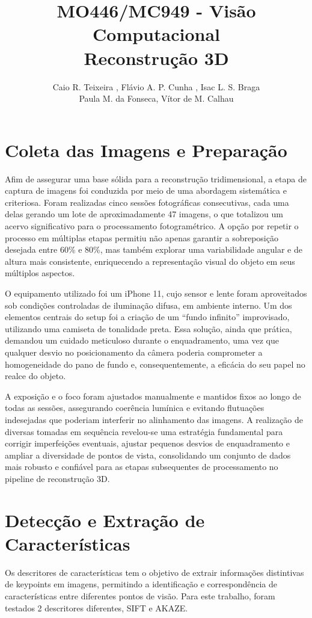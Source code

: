 \documentclass[12pt]{article}
\title{MO446/MC949 - Visão Computacional\\Reconstrução 3D}
\author{Caio R. Teixeira , Flávio A. P. Cunha , Isac L. S. Braga \\ Paula M. da Fonseca, Vítor de M. Calhau}
\begin{document}
 

\maketitle


\section{Coleta das Imagens e Preparação}
Afim de assegurar uma base sólida para a reconstrução tridimensional, a etapa de captura de imagens foi conduzida por meio de uma abordagem sistemática e criteriosa. Foram realizadas cinco sessões fotográficas consecutivas, cada uma delas gerando um lote de aproximadamente 47 imagens, o que totalizou um acervo significativo para o processamento fotogramétrico. A opção por repetir o processo em múltiplas etapas permitiu não apenas garantir a sobreposição desejada entre 60\% e 80\%, mas também explorar uma variabilidade angular e de altura mais consistente, enriquecendo a representação visual do objeto em seus múltiplos aspectos.

O equipamento utilizado foi um iPhone 11, cujo sensor e lente foram aproveitados sob condições controladas de iluminação difusa, em ambiente interno. Um dos elementos centrais do setup foi a criação de um “fundo infinito” improvisado, utilizando uma camiseta de tonalidade preta. Essa solução, ainda que prática, demandou um cuidado meticuloso durante o enquadramento, uma vez que qualquer desvio no posicionamento da câmera poderia comprometer a homogeneidade do pano de fundo e, consequentemente, a eficácia do seu papel no realce do objeto.

A exposição e o foco foram ajustados manualmente e mantidos fixos ao longo de todas as sessões, assegurando coerência lumínica e evitando flutuações indesejadas que poderiam interferir no alinhamento das imagens. A realização de diversas tomadas em sequência revelou-se uma estratégia fundamental para corrigir imperfeições eventuais, ajustar pequenos desvios de enquadramento e ampliar a diversidade de pontos de vista, consolidando um conjunto de dados mais robusto e confiável para as etapas subsequentes de processamento no pipeline de reconstrução 3D.

\section{Detecção e Extração de Características}

Os descritores de características tem o objetivo de extrair informações distintivas de keypoints em imagens, permitindo a identificação e correspondência de características entre diferentes pontos de visão.
Para este trabalho, foram testados 2 descritores diferentes, SIFT e AKAZE.
\end{document}
